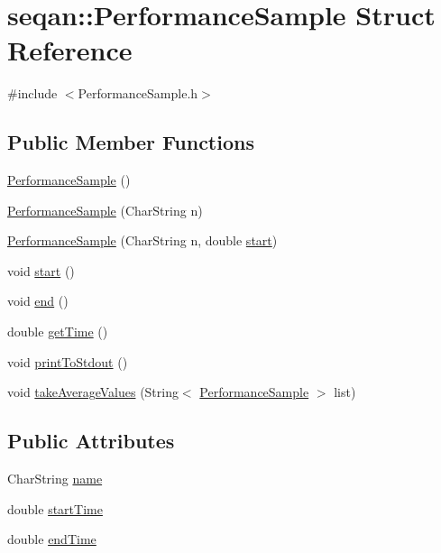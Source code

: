 \hypertarget{structseqan_1_1_performance_sample}{\section{seqan\-:\-:Performance\-Sample Struct Reference}
\label{structseqan_1_1_performance_sample}
}


{\ttfamily \#include $<$Performance\-Sample.\-h$>$}

\subsection*{Public Member Functions}
\begin{DoxyCompactItemize}
\item 
\hyperlink{structseqan_1_1_performance_sample_a8651d680f9e3830c3c387f52f3868f28}{Performance\-Sample} ()
\item 
\hyperlink{structseqan_1_1_performance_sample_a715fe9ca22322f3d51e27e19783ca11d}{Performance\-Sample} (Char\-String n)
\item 
\hyperlink{structseqan_1_1_performance_sample_abb034f31c5c550ce6c027806df55f2cb}{Performance\-Sample} (Char\-String n, double \hyperlink{structseqan_1_1_performance_sample_aa32edc31e6ad815364f5351959bef27f}{start})
\item 
void \hyperlink{structseqan_1_1_performance_sample_aa32edc31e6ad815364f5351959bef27f}{start} ()
\item 
void \hyperlink{structseqan_1_1_performance_sample_a77c483d55c1ce27e7e436d968ec24752}{end} ()
\item 
double \hyperlink{structseqan_1_1_performance_sample_a5eff59afa1efeb5ff09975f2a70c6795}{get\-Time} ()
\item 
void \hyperlink{structseqan_1_1_performance_sample_a339cf52d519b7948043f9aa1ea152eb6}{print\-To\-Stdout} ()
\item 
void \hyperlink{structseqan_1_1_performance_sample_a3fbe8137dc6639d13c536f1e5f5d9bd2}{take\-Average\-Values} (String$<$ \hyperlink{structseqan_1_1_performance_sample}{Performance\-Sample} $>$ list)
\end{DoxyCompactItemize}
\subsection*{Public Attributes}
\begin{DoxyCompactItemize}
\item 
Char\-String \hyperlink{structseqan_1_1_performance_sample_ad57c1dc73d7aeead774dc52c2bc9c21e}{name}
\item 
double \hyperlink{structseqan_1_1_performance_sample_aa836fab9103241ea23d5da5642aea14f}{start\-Time}
\item 
double \hyperlink{structseqan_1_1_performance_sample_a56846d44d5d90ff877cb09ac3a50408d}{end\-Time}
\end{DoxyCompactItemize}


